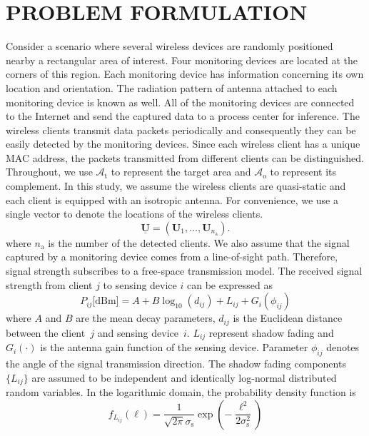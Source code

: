 \chapter{PROBLEM FORMULATION}

Consider a scenario where several wireless devices are randomly positioned nearby a rectangular area of interest.
Four monitoring devices are located at the corners of this region.
Each monitoring device has information concerning its own location and orientation.
The radiation pattern of antenna attached to each monitoring device is known as well.
All of the monitoring devices are connected to the Internet and send the captured data to a process center for inference.
The wireless clients transmit data packets periodically and consequently they can be easily detected by the monitoring devices.
Since each wireless client has a unique MAC address, the packets transmitted from different clients can be distinguished.
Throughout, we use $\mathcal{A}_{\mathrm{t}}$ to represent the target area and $\mathcal{A}_{\mathrm{o}}$ to represent its complement.
In this study, we assume the wireless clients are quasi-static and each client is equipped with an isotropic antenna.
For convenience, we use a single vector to denote the locations of the wireless clients.
\begin{equation}
\underline{\mathbf{U}} = (\mathbf{U}_1, \ldots, \mathbf{U}_{n_{\mathrm{a}}}).
\end{equation}
where $n_{\mathrm{a}}$ is the number of the detected clients.
We also assume that the signal captured by a monitoring device comes from a line-of-sight path.
Therefore, signal strength subscribes to a free-space transmission model.
The received signal strength from client $j$ to sensing device $i$ can be expressed as
\begin{equation} 
P_{ij} \text{[dBm]}
= A + B \log_{10}(d_{ij}) + L_{ij} + G_i (\phi_{ij})
\end{equation}
where $A$ and $B$ are the mean decay parameters, $d_{ij}$ is the Euclidean distance between the client~$j$ and sensing device~$i$.
$L_{ij}$ represent shadow fading and $G_i (\cdot)$ is the antenna gain function of the sensing device.
Parameter $\phi_{ij}$ denotes the angle of the signal transmission direction.
The shadow fading components $\{ L_{ij} \}$ are assumed to be independent and identically log-normal distributed random variables.
In the logarithmic domain, the probability density function is
\begin{equation} 
f_{L_{ij}} (\ell)
= \frac{1}{\sqrt{2 \pi} \sigma_{\mathrm{s}}} 
\exp \left( - \frac{\ell^2}{2 \sigma_{\mathrm{s}}^2} \right)
\end{equation}
